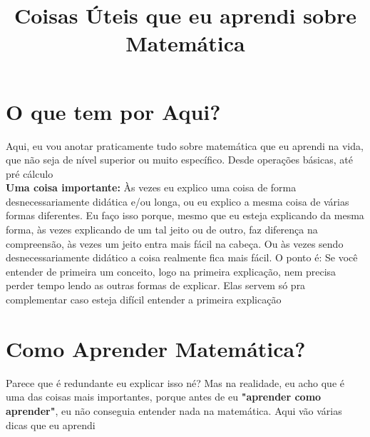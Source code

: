 \documentclass{article}
\title{Coisas Úteis que eu aprendi sobre Matemática}
\date{}
\begin{document}
\maketitle

\tableofcontents

\section{O que tem por Aqui?}
Aqui, eu vou anotar praticamente tudo sobre matemática que eu aprendi na vida, que não seja de nível superior ou muito específico. Desde operações básicas, até pré cálculo
\\[5pt]
\textbf{Uma coisa importante:} Às vezes eu explico uma coisa de forma desnecessariamente didática e/ou longa, ou eu explico a mesma coisa de várias formas diferentes. Eu faço isso porque, mesmo que eu esteja explicando da mesma forma, às vezes explicando de um tal jeito ou de outro, faz diferença na compreensão, às vezes um jeito entra mais fácil na cabeça. Ou às vezes sendo desnecessariamente didático a coisa realmente fica mais fácil. O ponto é: Se você entender de primeira um conceito, logo na primeira explicação, nem precisa perder tempo lendo as outras formas de explicar. Elas servem só pra complementar caso esteja difícil entender a primeira explicação 

\section{Como Aprender Matemática?}
Parece que é redundante eu explicar isso né? Mas na realidade, eu acho que é uma das coisas mais importantes, porque antes de eu \textbf{"aprender como aprender"}, eu não conseguia entender nada na matemática. Aqui vão várias dicas que eu aprendi
\end{document}
